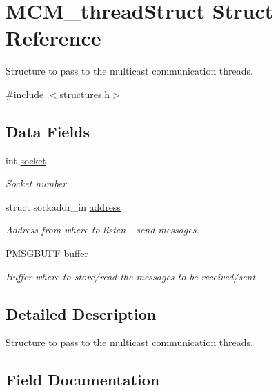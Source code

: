 \hypertarget{struct_m_c_m__thread_struct}{}\section{M\+C\+M\+\_\+thread\+Struct Struct Reference}
\label{struct_m_c_m__thread_struct}


Structure to pass to the multicast communication threads.  




{\ttfamily \#include $<$structures.\+h$>$}

\subsection*{Data Fields}
\begin{DoxyCompactItemize}
\item 
int \hyperlink{struct_m_c_m__thread_struct_a3666576f6b88007cc7b8f26c7da596c8}{socket}
\begin{DoxyCompactList}\small\item\em Socket number. \end{DoxyCompactList}\item 
struct sockaddr\+\_\+in \hyperlink{struct_m_c_m__thread_struct_a367491879e8ce396250c54956bc6ed5e}{address}
\begin{DoxyCompactList}\small\item\em Address from where to listen -\/ send messages. \end{DoxyCompactList}\item 
\hyperlink{structures_8h_ad63ff8138c416e3817bf5e9ddc033007}{P\+M\+S\+G\+B\+U\+FF} \hyperlink{struct_m_c_m__thread_struct_a626d3f45fb464f829c4fc7b78d2b98bf}{buffer}
\begin{DoxyCompactList}\small\item\em Buffer where to store/read the messages to be received/sent. \end{DoxyCompactList}\end{DoxyCompactItemize}


\subsection{Detailed Description}
Structure to pass to the multicast communication threads. 

\subsection{Field Documentation}
